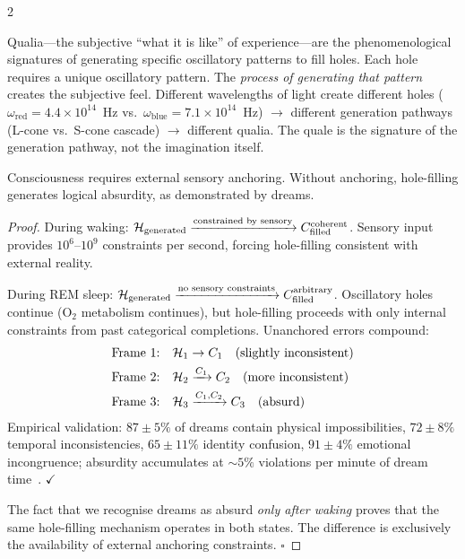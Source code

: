 \begin{multicols}{2}
\begin{corollary}
\label{cor:qualia}
Qualia---the subjective ``what it is like'' of experience---are the
phenomenological signatures of generating specific oscillatory patterns
to fill holes.  Each hole requires a unique oscillatory pattern.  The
\emph{process of generating that pattern} creates the subjective feel.
Different wavelengths of light create different holes
($\omega_{\text{red}} = 4.4\times10^{14}$~Hz vs.\ $\omega_{\text{blue}}
= 7.1\times10^{14}$~Hz) $\to$ different generation pathways (L-cone
vs.\ S-cone cascade) $\to$ different qualia.  The quale is the signature
of the generation pathway, not the imagination itself.
\end{corollary}

\begin{theorem}
\label{thm:dream_proof}
Consciousness requires external sensory anchoring.  Without anchoring,
hole-filling generates logical absurdity, as demonstrated by dreams.
\end{theorem}

\begin{proof}
During waking: $\mathcal{H}_{\text{generated}} \xrightarrow{\text{constrained by sensory}} C_{\text{filled}}^{\text{coherent}}$.
Sensory input provides $10^6$--$10^9$ constraints per second, forcing hole-filling
consistent with external reality.

During REM sleep: $\mathcal{H}_{\text{generated}} \xrightarrow{\text{no sensory constraints}} C_{\text{filled}}^{\text{arbitrary}}$.
Oscillatory holes continue (O$_2$ metabolism continues), but hole-filling
proceeds with only internal constraints from past categorical completions.
Unanchored errors compound:
\begin{align}
\text{Frame 1:} &\quad \mathcal{H}_1 \to C_1 \quad (\text{slightly inconsistent}) \\
\text{Frame 2:} &\quad \mathcal{H}_2 \xrightarrow{C_1} C_2 \quad (\text{more inconsistent}) \\
\text{Frame 3:} &\quad \mathcal{H}_3 \xrightarrow{C_1,C_2} C_3 \quad (\text{absurd})
\end{align}
Empirical validation: $87\pm5\%$ of dreams contain physical impossibilities,
$72\pm8\%$ temporal inconsistencies, $65\pm11\%$ identity confusion, $91\pm4\%$
emotional incongruence; absurdity accumulates at ${\sim}5\%$ violations per
minute of dream time~\citep{stickgold2005sleep}. $\checkmark$

The fact that we recognise dreams as absurd \emph{only after waking} proves
that the same hole-filling mechanism operates in both states.  The difference
is exclusively the availability of external anchoring constraints. $\square$
\end{proof}


\end{multicols}
